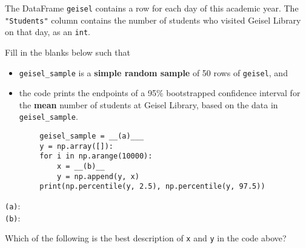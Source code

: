 \documentclass[twoside,12pt]{article}
\begin{document}
\begin{probset}
\begin{prob}
\end{prob}

\bigskip

\begin{prob}

The DataFrame \texttt{geisel} contains  a row for each day of this academic year. The \texttt{"Students"} column contains the number of students who visited Geisel Library on that day, as an \texttt{int}.

\begin{subprobset}

\begin{subprob}
    Fill in the blanks below such that
    \begin{itemize}
        \item \texttt{geisel\_sample} is a \textbf{simple random sample} of 50 rows of \texttt{geisel}, and 
        \item the code prints the endpoints of a 95\% bootstrapped confidence interval for the \textbf{mean} number of students at Geisel Library, based on the data in \texttt{geisel\_sample}.
    \end{itemize}

    \begin{verbatim}
        geisel_sample = __(a)___
        y = np.array([]): 
        for i in np.arange(10000): 
            x = __(b)__
            y = np.append(y, x)
        print(np.percentile(y, 2.5), np.percentile(y, 97.5))
    \end{verbatim}
    
\texttt{(a)}: \\
\texttt{(b)}: 
\end{subprob}

\newpage

\begin{subprob}
    Which of the following is the best description of \texttt{x} and \texttt{y} in the code above?

    \smallskip


    \smallskip
    


\end{subprob}
\end{subprobset}
\end{prob}
\end{probset}
\end{document}
